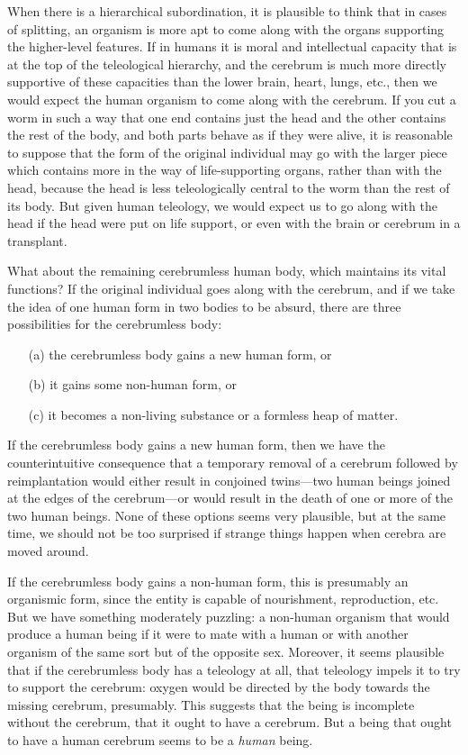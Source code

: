 When there is a hierarchical subordination, it is plausible to think that in cases of splitting, an organism is more apt
to come along with the organs supporting the higher-level features. If in humans it is moral and intellectual capacity 
that is at the top of the teleological hierarchy, and the cerebrum is much more directly supportive of these capacities
than the lower brain, heart, lungs, etc., then we would expect the human organism to come along with the cerebrum. If you
cut a worm in such a way that one end contains just the head and the other contains the rest of the body, and both parts
behave as if they were alive, it is reasonable to suppose that the form of the original individual may go with the larger
piece which contains more in the way of life-supporting organs, rather than with the head, because the head is less 
teleologically central to the worm than the rest of its body. But given human teleology, we would expect us to go along 
with the head if the head were put on life support, or even with the brain or cerebrum in a transplant.

What about the remaining cerebrumless human body, which maintains its vital functions? If the original individual goes along
with the cerebrum, and if we take the idea of one human form in two bodies to be absurd, there are three possibilities 
for the cerebrumless body:
\begin{itemize}
\item[(a)] the cerebrumless body gains a new human form, or 
\item[(b)] it gains some non-human form, or 
\item[(c)] it becomes a non-living substance or a formless heap of matter. 
\end{itemize}

If the cerebrumless body gains a new human form, then we have the counterintuitive consequence that a temporary removal
of a cerebrum followed by reimplantation would either result in conjoined twins---two human beings joined at the edges
of the cerebrum---or would result in the death of one or more of the two human beings. None of these options seems very
plausible, but at the same time, we should not be too surprised if strange things happen when cerebra are moved around.

If the cerebrumless body gains a non-human form, this is presumably an organismic form, since the entity is capable of
nourishment, reproduction, etc. But we have something moderately puzzling: a non-human organism
that would produce a human being if it were to mate with a human or with another organism of the same sort but of the
opposite sex. Moreover, it seems plausible that if the cerebrumless body has a teleology at all, that teleology impels
it to try to support the cerebrum: oxygen would be directed by the body towards the missing cerebrum, presumably. This
suggests that the being is incomplete without the cerebrum, that it ought to have a cerebrum. But a being that ought 
to have a human cerebrum seems to be a \textit{human} being. 

